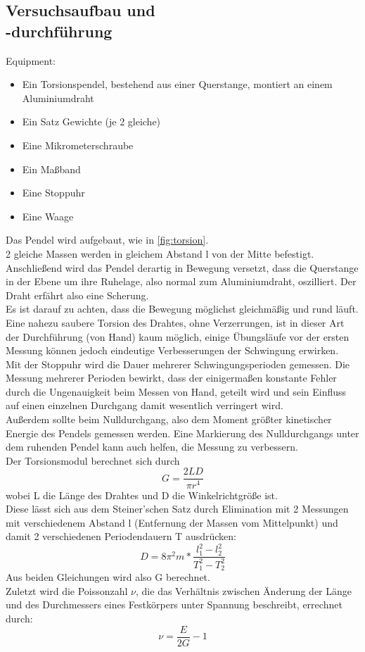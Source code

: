\documentclass[12pt,a4paper]{article}
\begin{document}
\begin{multicols}{2}
\subsection{Versuchsaufbau und \\-durchführung}
Equipment:
\begin{itemize}
	\item Ein Torsionspendel, bestehend aus einer Querstange, montiert an einem Aluminiumdraht
	\item Ein Satz Gewichte (je 2 gleiche)
	\item Eine Mikrometerschraube
	\item Ein Maßband
	\item Eine Stoppuhr
	\item Eine Waage
\end{itemize}
Das Pendel wird aufgebaut, wie in \ref{fig:torsion}.\\
2 gleiche Massen werden in gleichem Abstand l von der Mitte befestigt. Anschließend wird das Pendel derartig in Bewegung versetzt, dass die Querstange in der Ebene um ihre Ruhelage, also normal zum Aluminiumdraht, oszilliert. Der Draht erfährt also eine Scherung.\\
Es ist darauf zu achten, dass die Bewegung möglichst gleichmäßig und rund läuft. Eine nahezu saubere Torsion des Drahtes, ohne Verzerrungen, ist in dieser Art der Durchführung (von Hand) kaum möglich, einige Übungsläufe vor der ersten Messung können jedoch eindeutige Verbesserungen der Schwingung erwirken.\\
Mit der Stoppuhr wird die Dauer mehrerer Schwingungsperioden gemessen. Die Messung mehrerer Perioden bewirkt, dass der einigermaßen konstante Fehler durch die Ungenauigkeit beim Messen von Hand, geteilt wird und sein Einfluss auf einen einzelnen Durchgang damit wesentlich verringert wird.\\
Außerdem sollte beim Nulldurchgang, also dem Moment größter kinetischer Energie des Pendels gemessen werden. Eine Markierung des Nulldurchgangs unter dem ruhenden Pendel kann auch helfen, die Messung zu verbessern.\\
Der Torsionsmodul berechnet sich durch\\
$$G = \frac{2LD}{\pi r^4}$$
wobei L die Länge des Drahtes und D die Winkelrichtgröße ist.\\
Diese lässt sich aus dem Steiner'schen Satz durch Elimination mit 2 Messungen mit verschiedenem Abstand l (Entfernung der Massen vom Mittelpunkt) und damit 2 verschiedenen Periodendauern T ausdrücken:\\
$$ D=8\pi ^2 m* \frac{l_1^2-l_2^2}{T_1^2-T_2^2}$$
Aus beiden Gleichungen wird also G berechnet.\\
Zuletzt wird die Poissonzahl $\nu$, die das Verhältnis zwischen Änderung der Länge und des Durchmessers eines Festkörpers unter Spannung beschreibt, errechnet durch:\\
$$ \nu = \frac{E}{2G}-1$$


\end{multicols}
\end{document}
